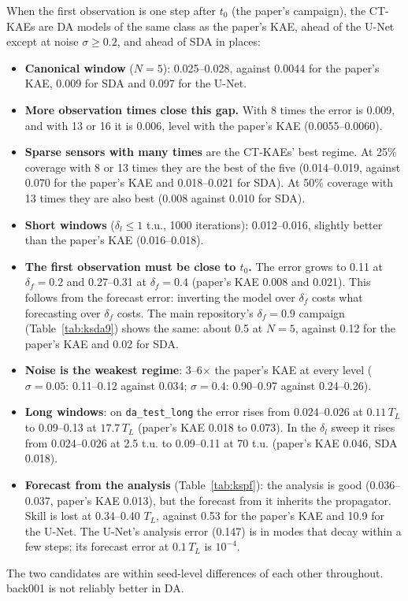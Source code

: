 \documentclass[10pt]{article}
\begin{document}
When the first observation is one step after $t_0$ (the paper's campaign), the CT-KAEs are DA
models of the same class as the paper's KAE, ahead of the U-Net except at noise $\sigma \ge 0.2$,
and ahead of SDA in places:
\begin{itemize}\itemsep1pt
\item \textbf{Canonical window} ($N = 5$): 0.025--0.028, against 0.0044 for the paper's KAE, 0.009 for
  SDA and 0.097 for the U-Net.
\item \textbf{More observation times close this gap.} With 8 times the error is 0.009, and with 13
  or 16 it is 0.006, level with the paper's KAE (0.0055--0.0060).
\item \textbf{Sparse sensors with many times} are the CT-KAEs' best regime. At 25\% coverage with
  8 or 13 times they are the best of the five (0.014--0.019, against 0.070 for the paper's KAE and
  0.018--0.021 for SDA). At 50\% coverage with 13 times they are also best (0.008 against 0.010 for SDA).
\item \textbf{Short windows} ($\delta_l \le 1$ t.u., 1000 iterations): 0.012--0.016, slightly better
  than the paper's KAE (0.016--0.018).
\item \textbf{The first observation must be close to $t_0$.} The error grows to 0.11 at
  $\delta_f = 0.2$ and 0.27--0.31 at $\delta_f = 0.4$ (paper's KAE 0.008 and 0.021). This follows from the
  forecast error: inverting the model over $\delta_f$ costs what forecasting over $\delta_f$ costs.
  The main repository's $\delta_f = 0.9$ campaign (Table~\ref{tab:ksda9}) shows the same: about 0.5 at
  $N = 5$, against 0.12 for the paper's KAE and 0.02 for SDA.
\item \textbf{Noise is the weakest regime}: 3--6$\times$ the paper's KAE at every level
  ($\sigma = 0.05$: 0.11--0.12 against 0.034; $\sigma = 0.4$: 0.90--0.97 against 0.24--0.26).
\item \textbf{Long windows}: on \texttt{da\_test\_long} the error rises from 0.024--0.026 at
  $0.11\,T_L$ to 0.09--0.13 at $17.7\,T_L$ (paper's KAE 0.018 to 0.073). In the $\delta_l$ sweep it
  rises from 0.024--0.026 at 2.5 t.u. to 0.09--0.11 at 70 t.u. (paper's KAE 0.046, SDA 0.018).
\item \textbf{Forecast from the analysis} (Table~\ref{tab:kspf}): the analysis is good (0.036--0.037,
  paper's KAE 0.013), but the forecast from it inherits the propagator. Skill is lost at
  0.34--0.40 $T_L$, against 0.53 for the paper's KAE and 10.9 for the U-Net. The U-Net's analysis error
  (0.147) is in modes that decay within a few steps; its forecast error at $0.1\,T_L$ is $10^{-4}$.
\end{itemize}
The two candidates are within seed-level differences of each other throughout. back001 is not
reliably better in DA.
\end{document}
